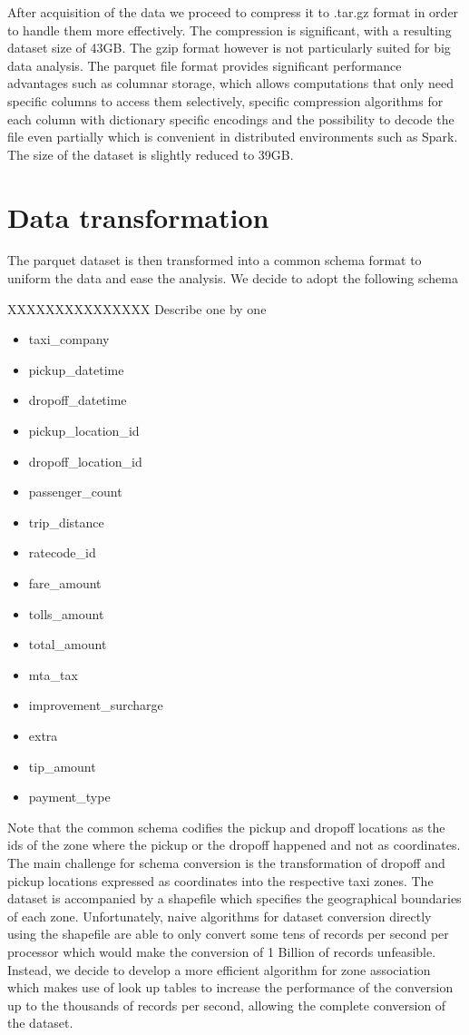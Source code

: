 \documentclass{acm_proc_article-sp-sigmod09}
\begin{document}
After acquisition of the data we proceed to compress it to .tar.gz format in order to handle them more effectively. The compression is significant, with a resulting dataset size of 43GB. The gzip format however is not particularly suited for big data analysis. The parquet file format provides significant performance advantages such as columnar storage, which allows computations that only need specific columns to access them selectively, specific compression algorithms for each column with dictionary specific encodings and the possibility to decode the file even partially which is convenient in distributed environments such as Spark. The size of the dataset is slightly reduced to 39GB.

\section{Data transformation}

The parquet dataset is then transformed into a common schema format to uniform the data and ease the analysis. We decide to adopt the following schema

XXXXXXXXXXXXXXX Describe one by one

\begin{itemize}
	\item taxi\_company
	\item pickup\_datetime
	\item dropoff\_datetime
	\item pickup\_location\_id
	\item dropoff\_location\_id
	\item passenger\_count
	\item trip\_distance
	\item ratecode\_id
	\item fare\_amount
	\item tolls\_amount
	\item total\_amount
	\item mta\_tax
	\item improvement\_surcharge
	\item extra
	\item tip\_amount
	\item payment\_type
\end{itemize}

Note that the common schema codifies the pickup and dropoff locations as the ids of the zone where the pickup or the dropoff happened and not as coordinates. The main challenge for schema conversion is the transformation of dropoff and pickup locations expressed as coordinates into the respective taxi zones. The dataset is accompanied by a shapefile which specifies the geographical boundaries of each zone. Unfortunately, naive algorithms for dataset conversion directly using the shapefile are able to only convert some tens of records per second per processor which would make the conversion of 1 Billion of records unfeasible. Instead, we decide to develop a more efficient algorithm for zone association which makes use of look up tables to increase the performance of the conversion up to the thousands of records per second, allowing the complete conversion of the dataset.
\end{document}
